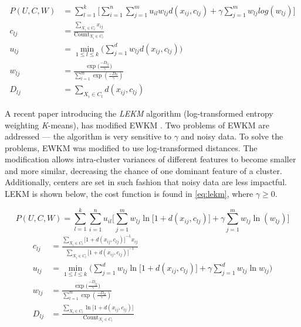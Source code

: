 \documentclass[../report.tex]{subfiles}
\begin{document}
\begin{align}
\label{eq:ewkm}
  P(U,C,W) &= \sum^k_{l=1} \Bigg[ \sum^n_{i=1} \sum^m_{j=1} u_{il} w_{ lj } d(x_{ij},c_{lj}) + \gamma \sum_{j=1}^{m}{ w_{lj} log (w_{lj}) } \Bigg] \\
c_{lj} &= \frac{\sum_{X_i \in C_l}{ x_{ij} }}{\text{Count}_{X_i \in C_l}} \\
u_{lj} &= \min_{1 \leq l \leq k}\Big( \sum_{j=1}^{d} w_{lj} d(x_{ij},c_{ lj })\Big) \\
\label{eq:ewkm_w}
w_{lj} &= \frac{\exp({\frac{-D_{lj}}{\gamma})}}{\sum_{t=1}^{m}{\exp{(\frac{-D_{lt}}{\gamma})}}} \\
\label{eq:ewkm_d}
D_{ lj } &= \sum_{X_i \in C_l}{d(x_{ij},c_{ lj })}
\end{align}

A recent paper introducing the \textit{LEKM} algorithm (log-transformed entropy weighting \textit{K}-means), has modified EWKM \cite{Gan2016}. Two problems of EWKM are addressed --- the algorithm is very sensitive to $\gamma$ and noisy data. To solve the problems, EWKM was modified to use log-transformed distances. The modification allows intra-cluster variances of different features to become smaller and more similar, decreasing the chance of one dominant feature of a cluster. Additionally, centers are set in such fashion that noisy data are less impactful. LEKM is shown below, the cost function is found in \cref{eq:lekm}, where $\gamma \geq 0$.

\begin{equation}
\label{eq:lekm}
P(U,C,W) = \sum^k_{l=1} \sum^n_{i=1} u_{il} \Bigg[ \sum^m_{j=1} w_{ lj } \ln\big[1 + d(x_{ij},c_{lj})\big] + \gamma \sum_{j=1}^{m}{ w_{lj} \ln (w_{lj}) } \Bigg]
\end{equation}
\begin{align}
c_{lj} &= \frac{\sum_{X_i \in C_l}{ {\big[1 + d(x_{ij},c_{ lj })\big]}^{-1} x_{ij} }}{\sum_{X_i \in C_l}{\big[1 + d(x_{ij},c_{ lj })\big]}^{-1}} \\
u_{lj} &= \min_{1 \leq l \leq k}\Bigg(\sum_{j=1}^{d} w_{lj} \ln\big[1 + d(x_{ij},c_{ lj })\big] + \gamma \sum_{j=1}^{d} w_{lj} \ln w_{lj}\Bigg) \\
w_{lj} &= \frac{\exp({\frac{-D_{lj}}{\gamma})}}{\sum_{t=1}^{m}{\exp{(\frac{-D_{lt}}{\gamma})}}} \\
\label{eq:lekm2}
D_{ lj } &= \frac{\sum_{X_i \in C_l}{\ln\big[1 + d(x_{ij},c_{ lj })\big]}}{\text{Count}_{X_i \in C_l}}
\end{align}

\end{document}
